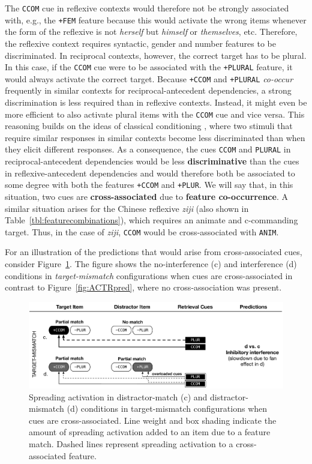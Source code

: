 \documentclass{cambridge7A}\usepackage[]{graphicx}\usepackage[]{color}
\newcommand{\actrcue}[1]{\texttt{\uppercase{#1}}}
\newcommand{\match}[1]{\texttt{+\uppercase{#1}}}
\begin{document}
{The \actrcue{CCOM} cue in reflexive contexts would therefore not be strongly associated with, e.g., the \match{FEM} feature because this would activate the wrong items whenever the form of the reflexive is not \textit{herself} but \textit{himself} or \textit{themselves}, etc. Therefore, the reflexive context requires syntactic, gender and number features to be discriminated.
In reciprocal contexts, however, the correct target has to be plural. In this case, if the \actrcue{CCOM} cue were to be associated with the \match{PLURAL} feature, it would always activate the correct target. 
Because \match{CCOM} and \match{PLURAL} \emph{co-occur} frequently in similar contexts for reciprocal-antecedent dependencies, a strong discrimination is less required than in reflexive contexts. Instead, it might even be more efficient to also activate plural items with the \actrcue{ccom} cue and vice versa. 
This reasoning builds on the ideas of classical conditioning \citep{RescorlaWagner1972}, where two stimuli that require similar responses in similar contexts become less discriminated than when they elicit different responses.
As a consequence, the cues \actrcue{ccom} and \actrcue{plural} in reciprocal-antecedent dependencies would be less \textbf{discriminative} than the cues in reflexive-antecedent dependencies and would therefore both be associated to some degree with both the features \match{ccom} and \match{plur}. We will say that, in this situation, two cues are  \textbf{cross-associated} due to \textbf{feature co-occurrence}.
}
A similar situation arises for the Chinese reflexive \textit{ziji} (also shown in Table~\ref{tbl:featurecombinations}), which requires an animate and c-commanding target. Thus, in the case of \textit{ziji}, \actrcue{ccom} would be cross-associated with \actrcue{anim}.


For an illustration of the predictions that would arise from cross-associated cues, consider Figure~\ref{fig:newmodelcueconf}. The figure shows the no-interference (c) and interference (d) conditions in \emph{target-mismatch} configurations when cues are cross-associated in contrast to Figure~\ref{fig:ACTRpred}, where no cross-association was present.

\begin{figure}[!htbp]
\includegraphics[width=\textwidth]{figures/tableNewmodelcueconf}
	\caption{Spreading activation in distractor-match (c) and distractor-mismatch (d) conditions in target-mismatch configurations when cues are cross-associated. Line weight and box shading indicate the amount of spreading activation added to an item due to a feature match. Dashed lines represent spreading activation to a cross-associated feature.}
	\label{fig:newmodelcueconf}
\end{figure}
\end{document}
